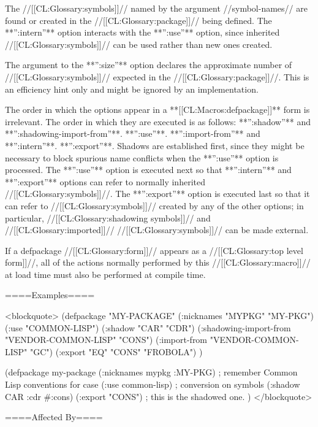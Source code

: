 
The //[[CL:Glossary:symbols]]// named by the argument //symbol-names// are found or created in the //[[CL:Glossary:package]]// being defined. The **'':intern''** option interacts with the **'':use''** option, since inherited //[[CL:Glossary:symbols]]// can be used rather than new ones created.


The argument to the **'':size''** option declares the approximate number of //[[CL:Glossary:symbols]]// expected in the //[[CL:Glossary:package]]//. This is an efficiency hint only and might be ignored by an implementation. \endlist

The order in which the options appear in a **[[CL:Macros:defpackage]]** form is irrelevant. The order in which they are executed is as follows: \beginlist {} **'':shadow''** and **'':shadowing-import-from''**.  **'':use''**.  **'':import-from''** and **'':intern''**.  **'':export''**. \endlist Shadows are established first, since they might be necessary to block spurious name conflicts when the **'':use''** option is processed. The **'':use''** option is executed next so that **'':intern''** and **'':export''** options can refer to normally inherited //[[CL:Glossary:symbols]]//. The **'':export''** option is executed last so that it can refer to //[[CL:Glossary:symbols]]// created by any of the other options; in particular, //[[CL:Glossary:shadowing symbols]]// and //[[CL:Glossary:imported]]// //[[CL:Glossary:symbols]]// can be made external.


If a {defpackage} //[[CL:Glossary:form]]// appears as a //[[CL:Glossary:top level form]]//, all of the actions normally performed by this //[[CL:Glossary:macro]]// at load time must also be performed at compile time.


====Examples====

<blockquote> (defpackage "MY-PACKAGE" (:nicknames "MYPKG" "MY-PKG") (:use "COMMON-LISP") (:shadow "CAR" "CDR") (:shadowing-import-from "VENDOR-COMMON-LISP" "CONS") (:import-from "VENDOR-COMMON-LISP" "GC") (:export "EQ" "CONS" "FROBOLA") )


(defpackage my-package (:nicknames mypkg :MY-PKG) ; remember Common Lisp conventions for case (:use common-lisp) ; conversion on symbols (:shadow CAR :cdr #:cons) (:export "CONS") ; this is the shadowed one. ) </blockquote>

====Affected By====


